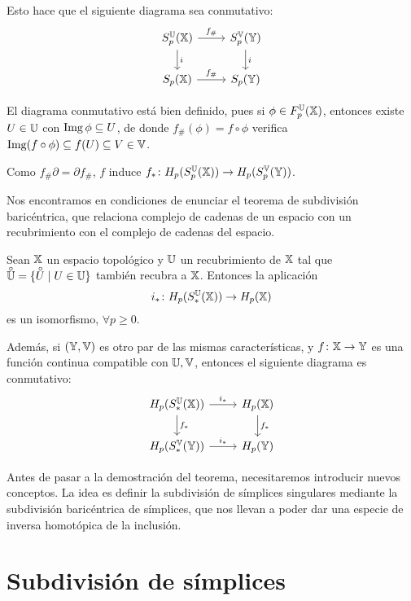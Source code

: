 Esto hace que el siguiente diagrama sea conmutativo:
\[ \begin{tikzcd}
  S_p^\U(\X) \arrow{r}{f_\#} \arrow{d}{i} & S_p^\V(\Y) \arrow{d}{i} \\
  \SX{p} \arrow{r}{f_\#} & \SY{p}
\end{tikzcd} \]

\begin{remark}
  El diagrama conmutativo está bien definido, pues si $\phi \in F_p^{\mathbb U}({\mathbb X})$, entonces existe $U \in {\mathbb U}$ con $\operatorname{Img} \phi \subseteq U$, de donde
  $f_\#(\phi) = f \circ \phi$ verifica $\operatorname{Img}(f \circ \phi) \subseteq f(U) \subseteq V \in {\mathbb V}$.
\end{remark}

Como $f_\# \partial = \partial f_\#$, $f$ induce $f_* \colon H_p(S_p^{\mathbb U}({\mathbb X})) \to H_p(S_p^{\mathbb V}({\mathbb Y}))$.

Nos encontramos en condiciones de enunciar el teorema de subdivisión baricéntrica, que relaciona complejo de cadenas
de un espacio con un recubrimiento con el complejo de cadenas del espacio.

\begin{theorem}
  Sean ${\mathbb X}$ un espacio topológico y ${\mathbb U}$ un recubrimiento de ${\mathbb X}$ tal que $\interior{\U} = \{\interior{U} \mid U \in \U\}$
  también recubra a ${\mathbb X}$. Entonces la aplicación
  \[ i_* \colon H_p(S_*^{\mathbb U}({\mathbb X})) \to H_p({\mathbb X}) \]
  es un isomorfismo, $\forall p \geq 0$.

  Además, si $({\mathbb Y}, {\mathbb V})$ es otro par de las mismas características, y $f \colon {\mathbb X} \to {\mathbb Y}$ es una función continua
  compatible con ${\mathbb U}, {\mathbb V}$, entonces el siguiente diagrama es conmutativo:
  \[ \begin{tikzcd}
    H_p(S_*^\U(\X)) \arrow{r}{i_*} \arrow{d}{f_*} & H_p(\X) \arrow{d}{f_*} \\
    H_p(S_*^\V(\Y)) \arrow{r}{i_*} & H_p(\Y)
  \end{tikzcd} \]

\end{theorem}

Antes de pasar a la demostración del teorema, necesitaremos introducir nuevos conceptos. La idea es definir la subdivisión
de símplices singulares mediante la subdivisión baricéntrica de símplices, que nos llevan a poder dar una especie de
inversa homotópica de la inclusión.

\section{Subdivisión de símplices}

